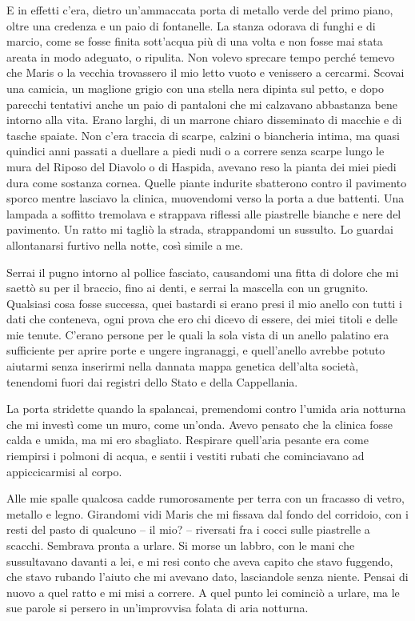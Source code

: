 E in effetti c'era, dietro un'ammaccata porta di metallo verde del primo
piano, oltre una credenza e un paio di fontanelle. La stanza odorava di
funghi e di marcio, come se fosse finita sott'acqua più di una volta e
non fosse mai stata areata in modo adeguato, o ripulita. Non volevo
sprecare tempo perché temevo che Maris o la vecchia trovassero il mio
letto vuoto e venissero a cercarmi. Scovai una camicia, un maglione
grigio con una stella nera dipinta sul petto, e dopo parecchi tentativi
anche un paio di pantaloni che mi calzavano abbastanza bene intorno alla
vita. Erano larghi, di un marrone chiaro disseminato di macchie e di
tasche spaiate. Non c'era traccia di scarpe, calzini o biancheria
intima, ma quasi quindici anni passati a duellare a piedi nudi o a
correre senza scarpe lungo le mura del Riposo del Diavolo o di Haspida,
avevano reso la pianta dei miei piedi dura come sostanza cornea. Quelle
piante indurite sbatterono contro il pavimento sporco mentre lasciavo la
clinica, muovendomi verso la porta a due battenti. Una lampada a
soffitto tremolava e strappava riflessi alle piastrelle bianche e nere
del pavimento. Un ratto mi tagliò la strada, strappandomi un sussulto.
Lo guardai allontanarsi furtivo nella notte, così simile a me.

Serrai il pugno intorno al pollice fasciato, causandomi una fitta di
dolore che mi saettò su per il braccio, fino ai denti, e serrai la
mascella con un grugnito. Qualsiasi cosa fosse successa, quei bastardi
si erano presi il mio anello con tutti i dati che conteneva, ogni prova
che ero chi dicevo di essere, dei miei titoli e delle mie tenute.
C'erano persone per le quali la sola vista di un anello palatino era
sufficiente per aprire porte e ungere ingranaggi, e quell'anello avrebbe
potuto aiutarmi senza inserirmi nella dannata mappa genetica dell'alta
società, tenendomi fuori dai registri dello Stato e della Cappellania.

La porta stridette quando la spalancai, premendomi contro l'umida aria
notturna che mi investì come un muro, come un'onda. Avevo pensato che la
clinica fosse calda e umida, ma mi ero sbagliato. Respirare quell'aria
pesante era come riempirsi i polmoni di acqua, e sentii i vestiti rubati
che cominciavano ad appiccicarmisi al corpo.

Alle mie spalle qualcosa cadde rumorosamente per terra con un fracasso
di vetro, metallo e legno. Girandomi vidi Maris che mi fissava dal fondo
del corridoio, con i resti del pasto di qualcuno -- il mio? -- riversati
fra i cocci sulle piastrelle a scacchi. Sembrava pronta a urlare. Si
morse un labbro, con le mani che sussultavano davanti a lei, e mi resi
conto che aveva capito che stavo fuggendo, che stavo rubando l'aiuto che
mi avevano dato, lasciandole senza niente. Pensai di nuovo a quel ratto
e mi misi a correre. A quel punto lei cominciò a urlare, ma le sue
parole si persero in un'improvvisa folata di aria notturna.


